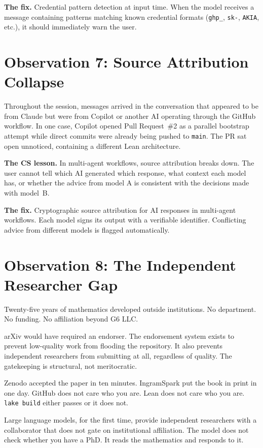\textbf{The fix.} Credential pattern detection at input time.
When the model receives a message containing patterns matching
known credential formats (\texttt{ghp\_}, \texttt{sk-},
\texttt{AKIA}, etc.), it should immediately warn the user.

\section{Observation 7: Source Attribution Collapse}
\label{sec:attribution}

Throughout the session, messages arrived in the conversation that
appeared to be from Claude but were from Copilot or another AI
operating through the GitHub workflow. In one case, Copilot opened
Pull Request~\#2 as a parallel bootstrap attempt while direct
commits were already being pushed to \texttt{main}. The PR sat
open unnoticed, containing a different Lean architecture.

\textbf{The CS lesson.} In multi-agent workflows, source
attribution breaks down. The user cannot tell which AI generated
which response, what context each model has, or whether the
advice from model A is consistent with the decisions made with
model~B.

\textbf{The fix.} Cryptographic source attribution for AI
responses in multi-agent workflows. Each model signs its output
with a verifiable identifier. Conflicting advice from different
models is flagged automatically.

\section{Observation 8: The Independent Researcher Gap}
\label{sec:independent}

Twenty-five years of mathematics developed outside institutions.
No department. No funding. No affiliation beyond G6 LLC.

arXiv would have required an endorser. The endorsement system
exists to prevent low-quality work from flooding the repository.
It also prevents independent researchers from submitting at all,
regardless of quality. The gatekeeping is structural, not
meritocratic.

Zenodo accepted the paper in ten minutes. IngramSpark put the
book in print in one day. GitHub does not care who you are. Lean
does not care who you are. \texttt{lake build} either passes or
it does not.

Large language models, for the first time, provide independent
researchers with a collaborator that does not gate on institutional
affiliation. The model does not check whether you have a PhD. It
reads the mathematics and responds to it.

